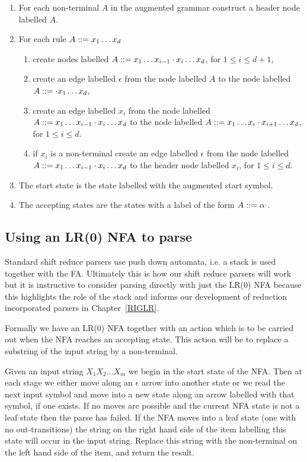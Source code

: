 \begin{enumerate}
\item
For each non-terminal $A$ in the augmented grammar construct a header node
labelled $A$.

\item
For each rule $A::= x_1\ldots x_d$ 
\begin{enumerate}
\item
create nodes labelled $A::=
x_1\ldots x_{i-1}\cdot x_i\ldots x_d$, for $1\leq i\leq d+1$, 
\item
create an edge labelled $\epsilon$ from the node labelled $A$ to the
node labelled $A::=\cdot x_1\ldots x_d$, 
\item
create an edge labelled $x_i$ from the node labelled
$A::= x_1\ldots x_{i-1}\cdot x_i\ldots x_d$ to the node labelled
$A::=
x_1\ldots x_{i}\cdot x_{i+1}\ldots x_d$, for $1\leq i\leq d$.
\item
if $x_i$ is a non-terminal create an edge labelled $\epsilon$ from the 
node labelled
$A::= x_1\ldots x_{i-1}\cdot x_i\ldots x_d$ to the header
node labelled $x_i$, for $1\leq i\leq d$.
\end{enumerate}
\item
The start state is the state labelled with the augmented start symbol.
\item
The accepting states are the states with a label of the form
$A::=\alpha\cdot$.
\end{enumerate}

\subsection{Using an LR(0) NFA to parse}

Standard shift reduce parsers use push down automata, i.e. a
stack is used together with the FA. Ultimately this is how our shift
reduce parsers will work but it is instructive to consider parsing
directly with just the LR(0) NFA because this highlights the role of
the stack and informs our development of reduction incorporated 
parsers in Chapter~\ref{RIGLR}.

Formally we have an LR(0) NFA together with an action which is to be
carried out when the NFA reaches an accepting state. This action will
be to replace a substring of the input string by a non-terminal.

Given an input string $X_1X_2\ldots X_m$ we begin in the start state of the
NFA. Then at each stage we either move along an $\epsilon$ arrow
into another state or we read the next input symbol and move into a new
state along an arrow labelled with that symbol, if one exists.
If no moves are possible and the current NFA state is not a leaf state
then the parse has failed. If the NFA moves into
a leaf state (one with no out-transitions) 
the string on the right hand side of the item
labelling this state will occur in the
input string. Replace this string with the non-terminal on the left
hand side of the item, and return the result.

